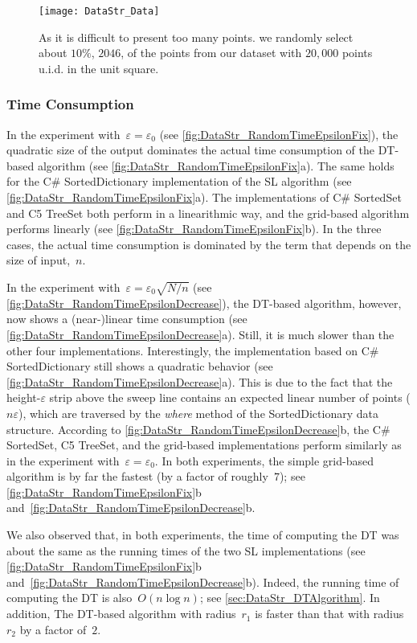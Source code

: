 \begin{figure}[tb]
\centering
\texttt{[image: DataStr\_Data]}
\caption{As it is difficult to present too many points.
	we randomly select about $10\%$, $2046$,
	of the points from our dataset 
	with $20{,}000$ points
	u.i.d. in the unit square.
}
\label{fig:DataStr_RandomData}
\end{figure}

\subsubsection{Time Consumption}
In the experiment with~$\varepsilon =\varepsilon_{0}$ 
(see \fig\ref{fig:DataStr_RandomTimeEpsilonFix}), 
the quadratic size of the output dominates the 
actual time consumption of the DT-based algorithm
(see \fig\ref{fig:DataStr_RandomTimeEpsilonFix}a).
The same holds for the C\# SortedDictionary 
implementation of the SL algorithm
(see \fig\ref{fig:DataStr_RandomTimeEpsilonFix}a). 
The implementations of C\# SortedSet and C5 TreeSet  
both perform in a linearithmic way, 
and the grid-based algorithm performs linearly
(see \fig\ref{fig:DataStr_RandomTimeEpsilonFix}b).
In the three cases, the actual time consumption is 
dominated by the term 
that depends on the size of input,~$n$.


In the experiment with~$\varepsilon =\varepsilon_{0}\sqrt{N/n}$ 
(see \fig\ref{fig:DataStr_RandomTimeEpsilonDecrease}), 
the DT-based algorithm, however, now shows 
a (near-)linear time consumption
(see \fig\ref{fig:DataStr_RandomTimeEpsilonDecrease}a). 
Still, it is much slower than the other four implementations. 
Interestingly, the implementation based on C\# SortedDictionary 
still shows a quadratic behavior
(see \fig\ref{fig:DataStr_RandomTimeEpsilonDecrease}a). 
This is due to the fact 
that the height-$\varepsilon $ strip above the sweep line 
contains an expected linear number of points ($n\varepsilon$), 
which are traversed by the \emph{where} method 
of the SortedDictionary data structure.
According to \fig\ref{fig:DataStr_RandomTimeEpsilonDecrease}b,
the C\# SortedSet, C5 TreeSet, and the grid-based 
implementations 
perform similarly as in the experiment 
with~$\varepsilon =\varepsilon_{0}$. 
In both experiments, the simple grid-based algorithm is by 
far the fastest
(by a factor of roughly~$7$);
see \figs\ref{fig:DataStr_RandomTimeEpsilonFix}b
and~\ref{fig:DataStr_RandomTimeEpsilonDecrease}b.


We also observed that, in both experiments, 
the time of computing the DT was about 
the same as the running times of 
the two SL implementations
(see \figs\ref{fig:DataStr_RandomTimeEpsilonFix}b
and~\ref{fig:DataStr_RandomTimeEpsilonDecrease}b).
Indeed, the running time of computing the DT 
is also~$O(n\log n)$; see \sect\ref{sec:DataStr_DTAlgorithm}.
In addition, The DT-based 
algorithm with radius~$r_{1}$ is faster than 
that with radius~$r_{2}$ by a factor of~$2$.


